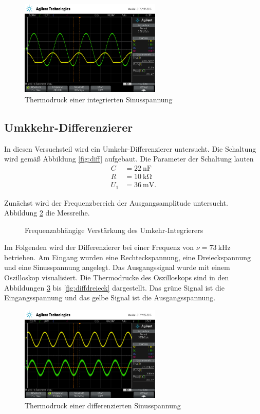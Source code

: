 \begin{figure}
	\centering
	\includegraphics[width=0.6\textwidth]{img/scope_3_int_sin.png}
	\caption{Thermodruck einer integrierten Sinusspannung}
	\label{fig:intsin}
\end{figure}

\subsection{Umkkehr-Differenzierer}
In diesen Versuchsteil wird ein Umkehr-Differenzierer untersucht.
Die Schaltung wird gemäß Abbildung \ref{fig:diff} aufgebaut.
Die Parameter der Schaltung lauten
\begin{align}
	C &= \SI{22}{\nano \farad} \\
	R &= \SI{10}{\kilo \ohm} \\
	U_1 &= \SI{36}{\milli \volt}.
\end{align}

Zunächst wird der Frequenzbereich der Ausgangsamplitude untersucht.
Abbildung \ref{fig:plotdiff} die Messreihe.
\begin{figure}
	\centering
	\resizebox{\pltwidth}{!}{
		
	}
	\caption{Frequenzabhängige Verstärkung des Umkehr-Integrierers}
	\label{fig:plotdiff}
\end{figure}

Im Folgenden wird der Differenzierer bei einer Frequenz von $\nu = \SI{73}{\kilo \hertz}$ betrieben.
Am Eingang wurden eine Rechteckspannung, eine Dreieckspannung und eine Sinusspannung angelegt.
Das Ausgangssignal wurde mit einem Oszilloskop visualisiert.
Die Thermodrucke des Oszilloskops sind in den Abbildungen \ref{fig:diffsin} bis \ref{fig:diffdreieck} dargestellt.
Das grüne Signal ist die Eingangsspannung und das gelbe Signal ist die Ausgangsspannung.

\begin{figure}
	\centering
	\includegraphics[width=0.6\textwidth]{img/scope_4_diff_sin.png}
	\caption{Thermodruck einer differenzierten Sinusspannung}
	\label{fig:diffsin}
\end{figure}

